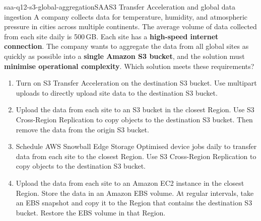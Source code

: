 
\begin{question}{saa-q12-s3-global-aggregation}{SAA}{S3 Transfer Acceleration and global data ingestion}
A company collects data for temperature, humidity, and atmospheric pressure in cities across multiple continents.
The average volume of data collected from each site daily is 500\,GB.
Each site has a \textbf{high-speed internet connection}.
The company wants to aggregate the data from all global sites as quickly as possible into a \textbf{single Amazon S3 bucket},
and the solution must \textbf{minimise operational complexity}.
Which solution meets these requirements?

\begin{enumerate}[label=\Alph*.]
  \item Turn on S3 Transfer Acceleration on the destination S3 bucket.
        Use multipart uploads to directly upload site data to the destination S3 bucket.
  \item Upload the data from each site to an S3 bucket in the closest Region.
        Use S3 Cross-Region Replication to copy objects to the destination S3 bucket.
        Then remove the data from the origin S3 bucket.
  \item Schedule AWS Snowball Edge Storage Optimised device jobs daily to transfer data from each site to the closest Region.
        Use S3 Cross-Region Replication to copy objects to the destination S3 bucket.
  \item Upload the data from each site to an Amazon EC2 instance in the closest Region.
        Store the data in an Amazon EBS volume.
        At regular intervals, take an EBS snapshot and copy it to the Region that contains the destination S3 bucket.
        Restore the EBS volume in that Region.
\end{enumerate}
\end{question}

